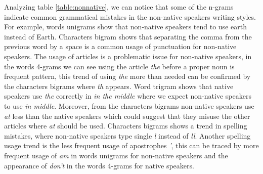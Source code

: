 \documentclass[10pt,a5paper,twoside]{article}
\begin{document}
Analyzing table \ref{table:nonnative}, we can notice that some of the n-grams
indicate common grammatical mistakes in the non-native speakers writing styles.
For example, words unigrams show that non-native speakers tend to use earth
instead of Earth. Characters bigram shows that separating the comma from the
previous word by a space is a common usage of punctuation for non-native speakers.
The usage of articles is a problematic issue for non-native speakers, in the
words 4-grams we can see using the article \emph{the} before a proper noun is
frequent pattern, this trend of using \emph{the} more than needed can be confirmed by the characters bigrams where \emph{th} appears. Word trigram shows that native speakers use \emph{the} correctly in \emph{in the middle} where we expect non-native speakers to use \emph{in middle}.
Moreover, from the characters bigrams non-native speakers use \emph{at} less
than the native speakers which could suggest that they misuse the other articles
where \emph{at} should be used. Characters bigrams shows a trend in spelling
mistakes, where non-native speakers type single \emph{l} instead of \emph{ll}.
Another spelling usage trend is the less frequent usage of apostrophes \emph{'},
this can be traced by more frequent usage of \emph{am} in words unigrams for non-native speakers and the appearance of \emph{don't} in the words 4-grams for native speakers.
\end{document}
